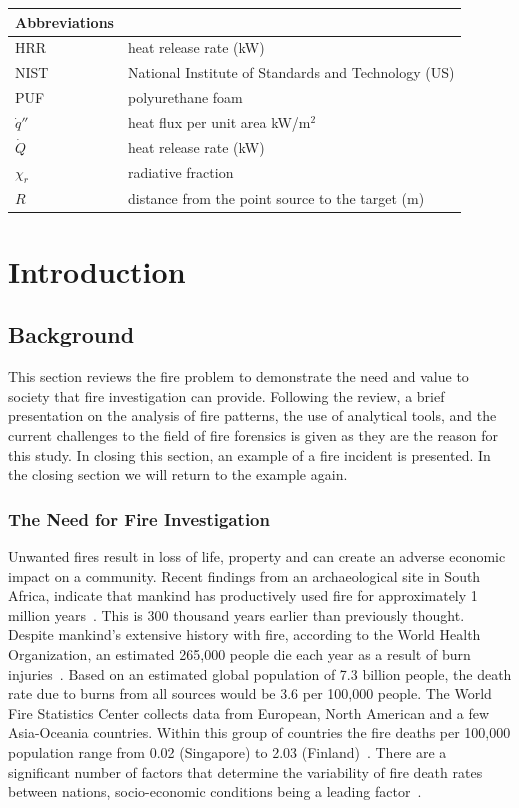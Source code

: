 \documentclass[twoside]{uocthesis}
\begin{document}
\begin{table}[t!]
  \centering
  \begin{tabular}{l|l}
  	Abbreviations \\
     \hline
     HRR	            & heat release rate (kW) \\
     NIST        	    & National Institute of Standards and Technology (US) \\
     PUF                & polyurethane foam  \\
     $\dot{q}''$        & heat flux per unit area kW/m$^2$ \\
	 $\dot{Q}$          & heat release rate (kW) \\ 
	 $\chi_r$           & radiative fraction \\
	 $R$                & distance from the point source to the target (m) \\
   \end{tabular}
 \end{table}

\textpages

\chapter{Introduction}
\label{chapter:Introduction}
\section{Background}

This section reviews the fire problem to demonstrate the need and value to society that fire investigation can provide. Following the review, a brief presentation on the analysis  of fire patterns, the use of analytical tools, and the current challenges to the field of fire forensics is given as they are the reason for this study.  In closing this section, an example of a fire incident is presented. In the closing section we will return to the example again.   

\subsection{The Need for Fire Investigation}
Unwanted fires result in loss of life, property and can create an adverse economic impact on a community.  Recent findings from an archaeological site in South Africa, indicate that mankind has productively used fire for approximately 1 million years~\cite{Berna:2012}.  This is 300 thousand years earlier than previously thought.  Despite mankind's extensive history with fire, according to the World Health Organization, an estimated 265,000 people die each year as a result of burn injuries~\cite{WHO:2014}.  Based on an estimated global population of 7.3 billion people, the death rate due to burns from all sources would be 3.6 per 100,000 people.  The World Fire Statistics Center collects data from European, North American and a few Asia-Oceania countries.  Within this group of countries the fire deaths per 100,000 population range from 0.02 (Singapore) to 2.03 (Finland)~\cite{Climate:2014}. There are a significant number of factors that determine the variability of fire death rates between nations, socio-economic conditions being a leading factor~\cite{WHO:2014}.
\end{document}
